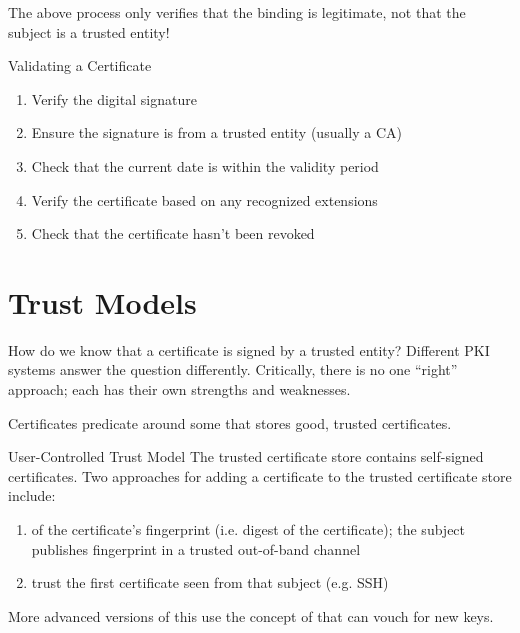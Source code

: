 \begin{notebox}
    The above process only verifies that the binding is legitimate, not that the subject is a trusted entity!
\end{notebox}

\begin{tecbox}{Validating a Certificate}{}
    \begin{enumerate}
        \item Verify the digital signature
        \item Ensure the signature is from a trusted entity (usually a CA)
        \item Check that the current date is within the validity period
        \item Verify the certificate based on any recognized extensions
        \item Check that the certificate hasn't been revoked
    \end{enumerate}
\end{tecbox}

\section{Trust Models}
How do we know that a certificate is signed by a trusted entity? Different PKI systems answer the question differently. Critically, there is no one ``right'' approach; each has their own strengths and weaknesses.

Certificates predicate around some  that stores good, trusted certificates.

\begin{exbox}{User-Controlled Trust Model}{}
    The trusted certificate store contains self-signed certificates. Two approaches for adding a certificate to the trusted certificate store include:
    \begin{enumerate}
        \item {} of the certificate's fingerprint (i.e. digest of the certificate); the subject publishes fingerprint in a trusted out-of-band channel
        \item {} trust the first certificate seen from that subject (e.g. SSH)
    \end{enumerate}
    More advanced versions of this use the concept of  that can vouch for new keys.
\end{exbox}

